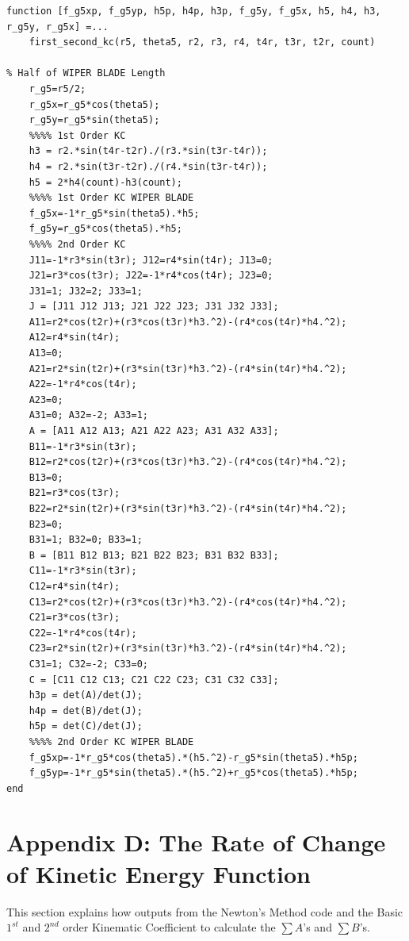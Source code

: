 \documentclass[12pt]{article}
\begin{document}
\begingroup
\fontsize{8pt}{10pt}\selectfont
\begin{verbatim}
function [f_g5xp, f_g5yp, h5p, h4p, h3p, f_g5y, f_g5x, h5, h4, h3, r_g5y, r_g5x] =...
    first_second_kc(r5, theta5, r2, r3, r4, t4r, t3r, t2r, count)

% Half of WIPER BLADE Length
    r_g5=r5/2;
    r_g5x=r_g5*cos(theta5);
    r_g5y=r_g5*sin(theta5);
    %%%% 1st Order KC
    h3 = r2.*sin(t4r-t2r)./(r3.*sin(t3r-t4r));
    h4 = r2.*sin(t3r-t2r)./(r4.*sin(t3r-t4r));
    h5 = 2*h4(count)-h3(count);
    %%%% 1st Order KC WIPER BLADE
    f_g5x=-1*r_g5*sin(theta5).*h5;
    f_g5y=r_g5*cos(theta5).*h5;
    %%%% 2nd Order KC
    J11=-1*r3*sin(t3r); J12=r4*sin(t4r); J13=0;
    J21=r3*cos(t3r); J22=-1*r4*cos(t4r); J23=0;
    J31=1; J32=2; J33=1;
    J = [J11 J12 J13; J21 J22 J23; J31 J32 J33];
    A11=r2*cos(t2r)+(r3*cos(t3r)*h3.^2)-(r4*cos(t4r)*h4.^2);
    A12=r4*sin(t4r);
    A13=0;
    A21=r2*sin(t2r)+(r3*sin(t3r)*h3.^2)-(r4*sin(t4r)*h4.^2);
    A22=-1*r4*cos(t4r);
    A23=0;
    A31=0; A32=-2; A33=1;
    A = [A11 A12 A13; A21 A22 A23; A31 A32 A33];
    B11=-1*r3*sin(t3r);
    B12=r2*cos(t2r)+(r3*cos(t3r)*h3.^2)-(r4*cos(t4r)*h4.^2);
    B13=0;
    B21=r3*cos(t3r);
    B22=r2*sin(t2r)+(r3*sin(t3r)*h3.^2)-(r4*sin(t4r)*h4.^2);
    B23=0;
    B31=1; B32=0; B33=1;
    B = [B11 B12 B13; B21 B22 B23; B31 B32 B33];
    C11=-1*r3*sin(t3r);
    C12=r4*sin(t4r);
    C13=r2*cos(t2r)+(r3*cos(t3r)*h3.^2)-(r4*cos(t4r)*h4.^2);
    C21=r3*cos(t3r);
    C22=-1*r4*cos(t4r);
    C23=r2*sin(t2r)+(r3*sin(t3r)*h3.^2)-(r4*sin(t4r)*h4.^2);
    C31=1; C32=-2; C33=0;
    C = [C11 C12 C13; C21 C22 C23; C31 C32 C33];
    h3p = det(A)/det(J);
    h4p = det(B)/det(J);
    h5p = det(C)/det(J);
    %%%% 2nd Order KC WIPER BLADE
    f_g5xp=-1*r_g5*cos(theta5).*(h5.^2)-r_g5*sin(theta5).*h5p;
    f_g5yp=-1*r_g5*sin(theta5).*(h5.^2)+r_g5*cos(theta5).*h5p; 
end
\end{verbatim}
\endgroup

\newpage

\section*{Appendix D: The Rate of Change of Kinetic Energy Function}
\begin{doublespace}
This section explains how outputs from the Newton's Method code and the Basic $1^{st}$ and $2^{nd}$ order Kinematic Coefficient to calculate the $\sum A$'s and $\sum B$'s.
\end{doublespace}
\end{document}
